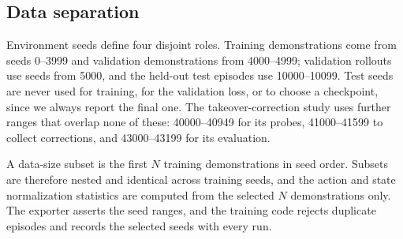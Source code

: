 \subsection{Data separation}
\label{sec:separation}
Environment seeds define four disjoint roles. Training demonstrations come
from seeds 0--3999 and validation demonstrations from 4000--4999; validation
rollouts use seeds from 5000, and the held-out test episodes use
10000--10099. Test seeds are never used for training, for the validation
loss, or to choose a checkpoint, since we always report the final one. The
takeover-correction study uses further ranges that overlap none of these:
40000--40949 for its probes, 41000--41599 to collect corrections, and
43000--43199 for its evaluation.

A data-size subset is the first $N$ training demonstrations in seed order.
Subsets are therefore nested and identical across training seeds, and the
action and state normalization statistics are computed from the selected $N$
demonstrations only. The exporter asserts the seed ranges, and the training
code rejects duplicate episodes and records the selected seeds with every run.
